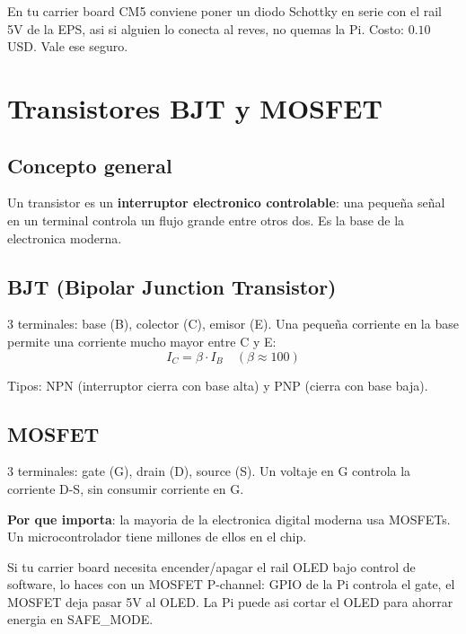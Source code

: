 \documentclass[11pt,a4paper,oneside,openright]{book}
\begin{document}
\begin{payload}
En tu carrier board CM5 conviene poner un diodo Schottky en serie con el
rail 5V de la EPS, asi si alguien lo conecta al reves, no quemas la Pi.
Costo: $0.10$ USD. Vale ese seguro.
\end{payload}

\chapter{Transistores BJT y MOSFET}

\section{Concepto general}

Un transistor es un \textbf{interruptor electronico controlable}: una pequeña
señal en un terminal controla un flujo grande entre otros dos. Es la base
de la electronica moderna.

\section{BJT (Bipolar Junction Transistor)}

3 terminales: base (B), colector (C), emisor (E). Una pequeña corriente
en la base permite una corriente mucho mayor entre C y E:
\begin{equation}
I_C = \beta \cdot I_B \quad (\beta \approx 100)
\end{equation}

Tipos: NPN (interruptor cierra con base alta) y PNP (cierra con base baja).

\section{MOSFET}

3 terminales: gate (G), drain (D), source (S). Un voltaje en G controla la
corriente D-S, sin consumir corriente en G.

\textbf{Por que importa}: la mayoria de la electronica digital moderna usa
MOSFETs. Un microcontrolador tiene millones de ellos en el chip.

\begin{payload}
Si tu carrier board necesita encender/apagar el rail OLED bajo control de
software, lo haces con un MOSFET P-channel: GPIO de la Pi controla el gate,
el MOSFET deja pasar 5V al OLED. La Pi puede asi cortar el OLED para
ahorrar energia en SAFE\_MODE.
\end{payload}
\end{document}
